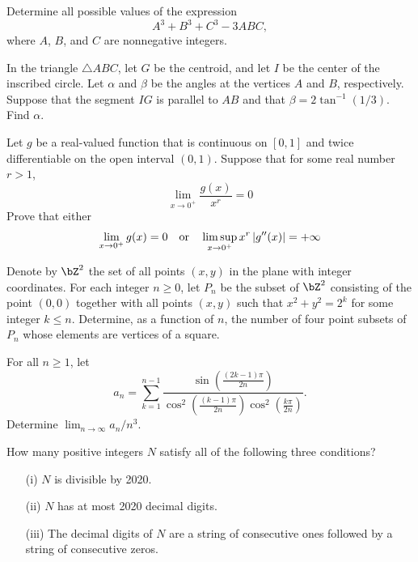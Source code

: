 \documentclass[12pt]{article}
\begin{document}
    \begin{exercise}[2019 A1]
        Determine all possible values of the expression
        \[A^3+B^3+C^3-3ABC,\]
        where \(A\), \(B\), and \(C\) are nonnegative integers.
    \end{exercise}
    
    \begin{exercise}[2019 A2]
        In the triangle \(\triangle ABC\), let \(G\) be the centroid, and let \(I\) be the center of the inscribed circle.
        Let \(\alpha\) and \(\beta\) be the angles at the vertices \(A\) and \(B\), respectively.
        Suppose that the segment \(IG\) is parallel to \(AB\) and that \(\beta=2\tan^{-1}(1/3)\).
        Find \(\alpha\).
    \end{exercise}

    \begin{exercise}[2019 A6]
        Let $g$ be a real-valued function that is continuous on $[0,1]$ and twice differentiable on the open interval $(0,1)$. Suppose that for some real number $r>1$, 
        \[\lim_{x\to 0^+} \frac{g(x)}{x^r}=0\] Prove that either 
        \[\lim_{x\to 0^+} g(x)=0\quad\text{or}\quad\limsup_{x\to 0^+}x^r\left\lvert g''(x) \right\rvert = +\infty\]
    \end{exercise}

    \begin{exercise}[2019 B1]
        Denote by \(\bZ^2\) the set of all points \((x,y)\) in the plane with integer coordinates.
        For each integer \(n\geq 0\), let \(P_n\) be the subset of \(\bZ^2\) consisting of the point \((0,0)\) together with all points \((x,y)\) such that \(x^2+y^2=2^k\) for some integer \(k\leq n\).
        Determine, as a function of \(n\), the number of four point subsets of \(P_n\) whose elements are vertices of a square.
    \end{exercise}
    
    \begin{exercise}[2019 B2]
        For all \(n\geq 1\), let
        \[a_n = \sum_{k=1}^{n-1}\frac{\sin\left(\frac{(2k-1)\pi}{2n}\right)}{\cos^2\left(\frac{(k-1)\pi}{2n}\right)\cos^2\left(\frac{k\pi}{2n}\right)}.\]
        Determine $\lim_{n\to\infty}a_n /n^3$.
    \end{exercise}

    \begin{exercise}[2020 A1]
        How many positive integers \(N\) satisfy all of the following three conditions?
        \begin{enumerate}
            \item[(i)] \(N\) is divisible by 2020.
            \item[(ii)] \(N\) has at most 2020 decimal digits.
            \item[(iii)] The decimal digits of \(N\) are a string of consecutive ones followed by a string of consecutive zeros.
        \end{enumerate}
    \end{exercise}
\end{document}

